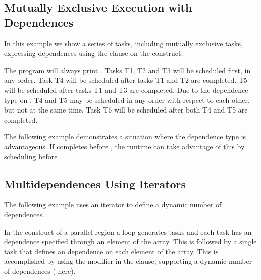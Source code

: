 \pagebreak
\subsection{Mutually Exclusive Execution with Dependences}
\label{subsec:task_dep_mutexinoutset}

In this example we show a series of tasks, including mutually exclusive
tasks, expressing dependences using the  clause on the
 construct.

The program will always print . Tasks T1, T2 and T3 will be scheduled first,
in any order. Task T4 will be scheduled after tasks T1 and T2 are
completed. T5 will be scheduled after tasks T1 and T3 are completed. Due
to the  dependence type on , T4 and T5 may be
scheduled in any order with respect to each other, but not at the same
time. Task T6 will be scheduled after both T4 and T5 are completed.



The following example demonstrates a situation where the 
dependence type is advantageous. If  completes
before , the runtime can take advantage of this by
scheduling  before .



\subsection{Multidependences Using Iterators}
\label{subsec:depend_iterator}

The following example uses an iterator to define a dynamic number of
dependences.

In the  construct of a parallel region a loop generates  tasks
and each task has an  dependence specified through an element of
the  array.  This is followed by a single task that defines an 
dependence on each element of the array.  This is accomplished by
using the  modifier in the  clause, supporting a dynamic number
of dependences ( here).

